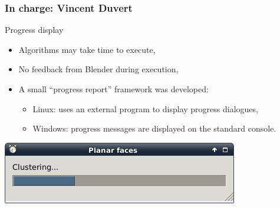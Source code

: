 \documentclass{beamer}
\begin{document}
\begin{frame}
	\frametitle{In charge: Vincent Duvert}
    \begin{block}{Progress display}
	\begin{itemize}
	\item Algorithms may take time to execute,
	\item No feedback from Blender during execution,
	\item A small ``progress report'' framework was developed:
	\begin{itemize}
		\item Linux: uses an external program to display progress dialogues,
		\item Windows: progress messages are displayed on the standard console.
	\end{itemize}
	\end{itemize}
    \end{block}
    \begin{center}
		\includegraphics[width=.5\textwidth]{progress_bar}
	\end{center}
    
\end{frame}
\end{document}
